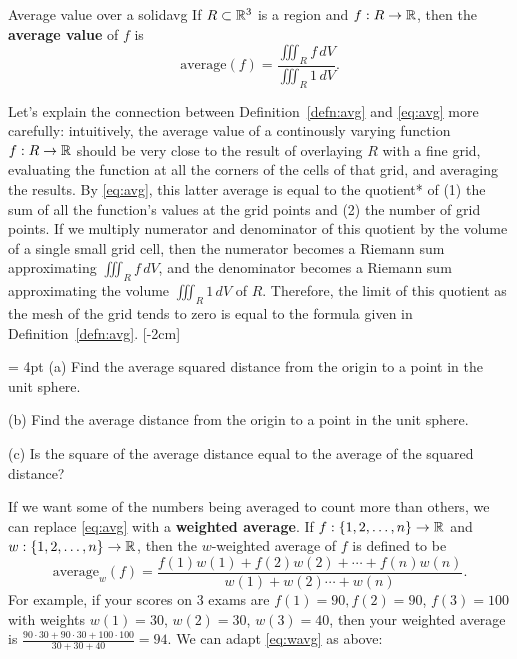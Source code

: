 \documentclass{watsonbook}
\begin{document}
\begin{defn}{Average value over a solid}{avg}
  If $R\subset \mathbb{R}^3$ is a region and $f: R \to \mathbb{R}$, then the \textbf{average value} of $f$ is
  \[
      \mathrm{average}(f) = \frac{\displaystyle{\iiint_R f \, dV}}{\displaystyle{\iiint_R 1 \, dV}}. 
  \]
\end{defn}

Let's explain the connection between Definition~\ref{defn:avg} and \eqref{eq:avg} more carefully: intuitively, the average value of a continously varying function $f:R\to \mathbb{R}$ should be very close to the result of overlaying $R$ with a fine grid, evaluating the function at all the corners of the cells of that grid, and averaging the results. By \eqref{eq:avg}, this latter average is equal to the quotient* of (1) the sum of all the function's values at the grid points and (2) the number of grid points. If we multiply numerator and denominator of this quotient by the volume of a single small grid cell, then the numerator becomes a Riemann sum approximating $\iiint_R f \, dV$, and the denominator becomes a Riemann sum approximating the volume $\iiint_R 1 \, dV$ of $R$. Therefore, the limit of this quotient as the mesh of the grid tends to zero is equal to the formula given in Definition~\ref{defn:avg}. [-2cm]

\begin{exercise}{}{} \parskip = 4pt 
  (a) Find the average squared distance from the origin to a point in the unit sphere.

  (b) Find the average distance from the origin to a point in the unit sphere.

  (c) Is the square of the average distance equal to the average of the squared distance? 
\end{exercise}

If we want some of the numbers being averaged to count more than others, we can replace \eqref{eq:avg} with a \textbf{weighted average}. If $f:\{1,2,\ldots,n\} \rightarrow \mathbb{R}$ and $w:\{1,2,\ldots,n\} \rightarrow \mathbb{R}$, then the $w$-weighted average of $f$ is defined to be 
\begin{equation} \label{eq:wavg} 
  \mathrm{average}_w(f) = \frac{f(1)w(1) + f(2)w(2) + \cdots + f(n)w(n)}{w(1)+w(2) \cdots + w(n)}. 
\end{equation}
For example, if your scores on 3 exams are $f(1)=90, f(2)=90$, $f(3)=100$ with weights $w(1)=30$, $w(2)=30$, $w(3)=40$, then your weighted average is $\tfrac{90\cdot 30 + 90\cdot 30 + 100 \cdot 100}{30+30+40} = 94$. We can adapt \eqref{eq:wavg} as above: 
\end{document}
